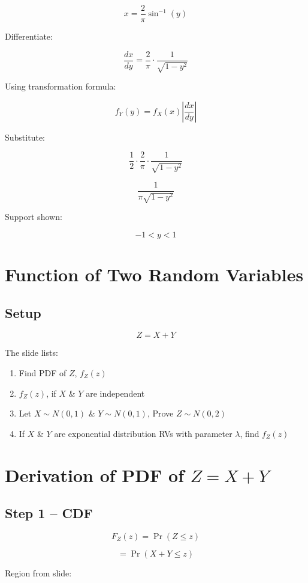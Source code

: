 \documentclass[12pt]{article}
\begin{document}
\[
x = \frac{2}{\pi}\sin^{-1}(y)
\]

Differentiate:

\[
\frac{dx}{dy}
=
\frac{2}{\pi}
\cdot
\frac{1}{\sqrt{1-y^2}}
\]

Using transformation formula:

\[
f_Y(y)=f_X(x)\left|\frac{dx}{dy}\right|
\]

Substitute:

\[
\frac{1}{2}
\cdot
\frac{2}{\pi}
\cdot
\frac{1}{\sqrt{1-y^2}}
\]

\[
\frac{1}{\pi\sqrt{1-y^2}}
\]

Support shown:

\[
-1<y<1
\]

\section{Function of Two Random Variables}

\subsection{Setup}

\[
Z = X + Y
\]

The slide lists:

\begin{enumerate}
    \item Find PDF of \( Z \), \( f_Z(z) \)
    \item \( f_Z(z) \), if \( X \) \& \( Y \) are independent
    \item Let \( X \sim N(0,1) \) \& \( Y \sim N(0,1) \), Prove \( Z \sim N(0,2) \)
    \item If \( X \) \& \( Y \) are exponential distribution RVs with parameter \( \lambda \), find \( f_Z(z) \)
\end{enumerate}

\section{Derivation of PDF of \( Z = X + Y \)}

\subsection{Step 1 – CDF}

\[
F_Z(z)=\Pr(Z \le z)
\]

\[
=\Pr(X+Y \le z)
\]

Region from slide:
\end{document}
